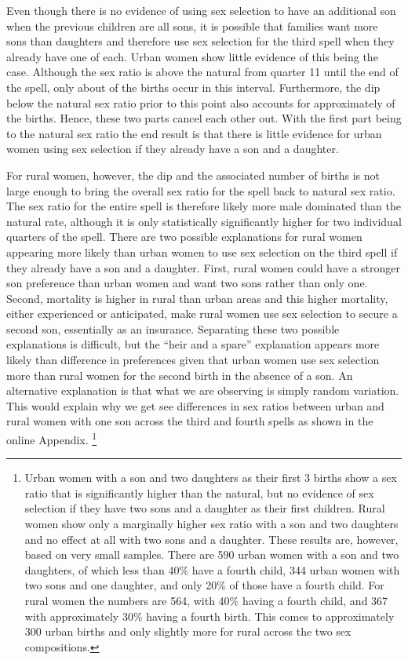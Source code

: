 \documentclass[12pt,letterpaper]{article}
\begin{document}

Even though there is no evidence of using sex selection to have an additional son when the 
previous children are all sons, it is possible that families want more sons than daughters 
and therefore use sex selection for the third spell when they already have one of each.
Urban women show little evidence of this being the case.
Although the sex ratio is above the natural from quarter 11 until the end of the spell,
only about  of the births occur in this interval.
Furthermore, the dip below the natural sex ratio prior to this point also accounts for
approximately  of the births.
Hence, these two parts cancel each other out.
With the first part being to the natural sex ratio the end result is that there
is little evidence for urban women using sex selection if they already have a son and
a daughter.

For rural women, however, the dip and the associated number of births is not
large enough to bring the overall sex ratio for the spell back to natural sex ratio.
The sex ratio for the entire spell is therefore likely more male dominated
than the natural rate, although it is only statistically significantly higher for two 
individual quarters of the spell.
There are two possible explanations for rural women appearing more likely than urban
women to use sex selection on the third spell if they already have a son and a daughter.
First, rural women could have a stronger son preference than urban women and want two sons 
rather than only one.
Second, mortality is higher in rural than urban areas and this higher mortality, either 
experienced or anticipated, make rural women use sex selection to secure a second son, 
essentially as an insurance.
Separating these two possible explanations is difficult, but the ``heir and a spare''
explanation appears  more likely than difference in preferences given that urban women use 
sex selection more than rural women for the second birth in the absence of a son.
An alternative explanation is that what we are observing is simply random variation.
This would explain why we get see differences in sex ratios between urban and rural
women with one son across the third and fourth spells as shown in the online Appendix.%
\footnote{
Urban women with a son and two daughters as their first 3 births show a sex ratio
that is significantly higher than the natural, but no evidence of sex
selection if they have two sons and a daughter as their first children.
Rural women show only a marginally higher sex ratio with a son and two daughters and no 
effect at all with two sons and a daughter.
These results are, however, based on very small samples.
There are 590 urban women with a son and two daughters, of which less than 40\% have a
fourth child, 344 urban women with two sons and one daughter, and only 20\% of those
have a fourth child.
For rural women the numbers are 564, with 40\% having a fourth child, and 367 with
approximately 30\% having a fourth birth.
This comes to approximately 300 urban births and only slightly more for rural across
the two sex compositions.
}
\end{document}
